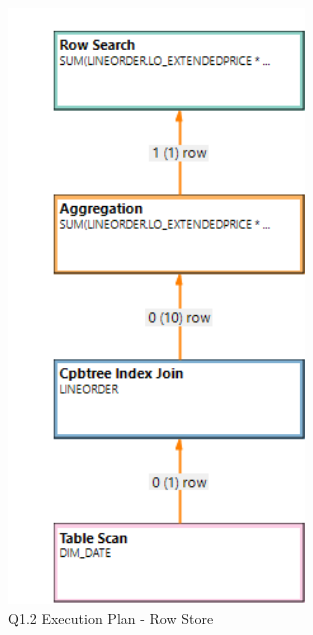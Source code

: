 \begin{figure}[H]
	\centering
	\includegraphics[width=0.7\textwidth]{images/q1-2-row-exec.png}
	\caption{Q1.2 Execution Plan - Row Store}\label{exec:q1.2-row}
\end{figure}


